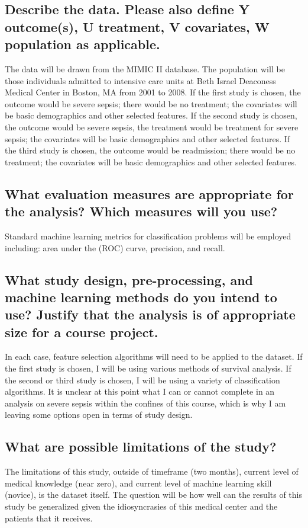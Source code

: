 \documentclass[twoside,11pt]{article}
\begin{document}
\subsection{Describe the data. Please also define Y outcome(s), U treatment, V covariates, W population as applicable.}
The data will be drawn from the MIMIC II database. The population will be those individuals admitted to intensive care units at Beth Israel Deaconess Medical Center in Boston, MA from 2001 to 2008. If the first study is chosen, the outcome would be severe sepsis; there would be no treatment; the covariates will be basic demographics and other selected features. If the second study is chosen, the outcome would be severe sepsis, the treatment would be treatment for severe sepsis; the covariates will be basic demographics and other selected features. If the third study is chosen, the outcome would be readmission; there would be no treatment; the covariates will be basic demographics and other selected features. 

\subsection{What evaluation measures are appropriate for the analysis? Which measures will you use?}
Standard machine learning metrics for classification problems will be employed including: area under the (ROC) curve, precision, and recall. 

\subsection{What study design, pre-processing, and machine learning methods do you intend to use? Justify that the analysis is of appropriate size for a course project.}
In each case, feature selection algorithms will need to be applied to the dataset. If the first study is chosen, I will be using various methods of survival analysis. If the second or third study is chosen, I will be using a variety of classification algorithms. It is unclear at this point what I can or cannot complete in an analysis on severe sepsis within the confines of this course, which is why I am leaving some options open in terms of study design. 

\subsection{What are possible limitations of the study?}
The limitations of this study, outside of timeframe (two months), current level of medical knowledge (near zero), and current level of machine learning skill (novice), is the dataset itself. The question will be how well can the results of this study be generalized given the idiosyncrasies of this medical center and the patients that it receives. 
\end{document}
